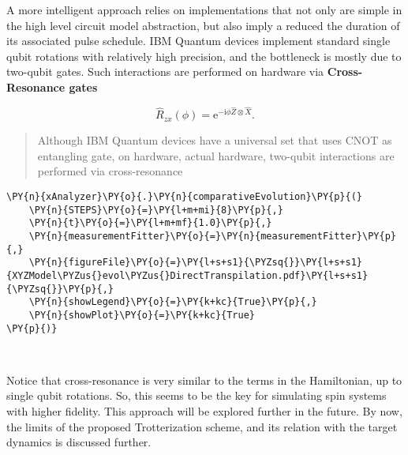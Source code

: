 A more intelligent approach relies on implementations that not only are
simple in the high level circuit model abstraction, but also imply a
reduced the duration of its associated pulse schedule. IBM Quantum
devices implement standard single qubit rotations with relatively high
precision, and the bottleneck is mostly due to two-qubit gates. Such
interactions are performed on hardware via \textbf{Cross-Resonance
gates}

\[
\hat{R}_{zx}(\phi) = \mathrm{e}^{-\mathrm{i}\phi\hat{Z}\otimes\hat{X}}.
\]

\begin{quote}
Although IBM Quantum devices have a universal set that uses CNOT as
entangling gate, on hardware, actual hardware, two-qubit interactions
are performed via cross-resonance
\end{quote}

    \begin{tcolorbox}[breakable, size=fbox, boxrule=1pt, pad at break*=1mm,colback=cellbackground, colframe=cellborder]
\begin{Verbatim}[commandchars=\\\{\}]
\PY{n}{xAnalyzer}\PY{o}{.}\PY{n}{comparativeEvolution}\PY{p}{(}
    \PY{n}{STEPS}\PY{o}{=}\PY{l+m+mi}{8}\PY{p}{,} 
    \PY{n}{t}\PY{o}{=}\PY{l+m+mf}{1.0}\PY{p}{,}
    \PY{n}{measurementFitter}\PY{o}{=}\PY{n}{measurementFitter}\PY{p}{,}
    \PY{n}{figureFile}\PY{o}{=}\PY{l+s+s1}{\PYZsq{}}\PY{l+s+s1}{XYZModel\PYZus{}evol\PYZus{}DirectTranspilation.pdf}\PY{l+s+s1}{\PYZsq{}}\PY{p}{,}
    \PY{n}{showLegend}\PY{o}{=}\PY{k+kc}{True}\PY{p}{,}
    \PY{n}{showPlot}\PY{o}{=}\PY{k+kc}{True}
\PY{p}{)}
\end{Verbatim}
\end{tcolorbox}

    \begin{center}
    \end{center}
    { \hspace*{\fill} \\}
    
    Notice that cross-resonance is very similar to the terms in the
Hamiltonian, up to single qubit rotations. So, this seems to be the key
for simulating spin systems with higher fidelity. This approach will be
explored further in the future. By now, the limits of the proposed
Trotterization scheme, and its relation with the target dynamics is
discussed further.

